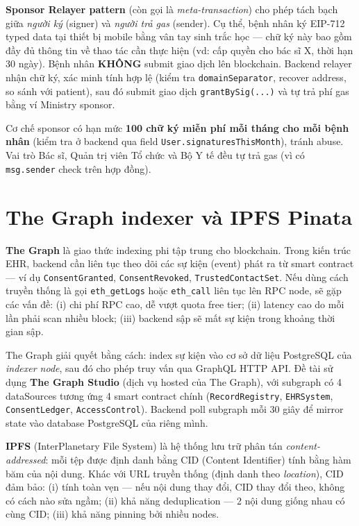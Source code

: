 \documentclass[../DoAn]{subfiles}
\begin{document}
\textbf{Sponsor Relayer pattern} (còn gọi là \textit{meta-transaction}) cho phép tách bạch giữa \textit{người ký} (signer) và \textit{người trả gas} (sender). Cụ thể, bệnh nhân ký EIP-712 typed data tại thiết bị mobile bằng vân tay sinh trắc học --- chữ ký này bao gồm đầy đủ thông tin về thao tác cần thực hiện (vd: cấp quyền cho bác sĩ X, thời hạn 30 ngày). Bệnh nhân \textbf{KHÔNG} submit giao dịch lên blockchain. Backend relayer nhận chữ ký, xác minh tính hợp lệ (kiểm tra \texttt{domainSeparator}, recover address, so sánh với patient), sau đó submit giao dịch \texttt{grantBySig(...)} và tự trả phí gas bằng ví Ministry sponsor.

Cơ chế sponsor có hạn mức \textbf{100 chữ ký miễn phí mỗi tháng cho mỗi bệnh nhân} (kiểm tra ở backend qua field \texttt{User.signaturesThisMonth}), tránh abuse. Vai trò Bác sĩ, Quản trị viên Tổ chức và Bộ Y tế đều tự trả gas (vì có \texttt{msg.sender} check trên hợp đồng).

\section{The Graph indexer và IPFS Pinata}

\textbf{The Graph} \cite{thegraph} là giao thức indexing phi tập trung cho blockchain. Trong kiến trúc EHR, backend cần liên tục theo dõi các sự kiện (event) phát ra từ smart contract --- ví dụ \texttt{ConsentGranted}, \texttt{ConsentRevoked}, \texttt{TrustedContactSet}. Nếu dùng cách truyền thống là gọi \texttt{eth\_getLogs} hoặc \texttt{eth\_call} liên tục lên RPC node, sẽ gặp các vấn đề: (i) chi phí RPC cao, dễ vượt quota free tier; (ii) latency cao do mỗi lần phải scan nhiều block; (iii) backend sập sẽ mất sự kiện trong khoảng thời gian sập.

The Graph giải quyết bằng cách: index sự kiện vào cơ sở dữ liệu PostgreSQL của \textit{indexer node}, sau đó cho phép truy vấn qua GraphQL HTTP API. Đề tài sử dụng \textbf{The Graph Studio} (dịch vụ hosted của The Graph), với subgraph có 4 dataSources tương ứng 4 smart contract chính (\texttt{RecordRegistry}, \texttt{EHRSystem}, \texttt{ConsentLedger}, \texttt{AccessControl}). Backend poll subgraph mỗi 30 giây để mirror state vào database PostgreSQL của riêng mình.

\textbf{IPFS} (InterPlanetary File System) là hệ thống lưu trữ phân tán \textit{content-addressed}: mỗi tệp được định danh bằng CID (Content Identifier) tính bằng hàm băm của nội dung. Khác với URL truyền thống (định danh theo \textit{location}), CID đảm bảo: (i) tính toàn vẹn --- nếu nội dung thay đổi, CID thay đổi theo, không có cách nào sửa ngầm; (ii) khả năng deduplication --- 2 nội dung giống nhau có cùng CID; (iii) khả năng pinning bởi nhiều nodes.
\end{document}
